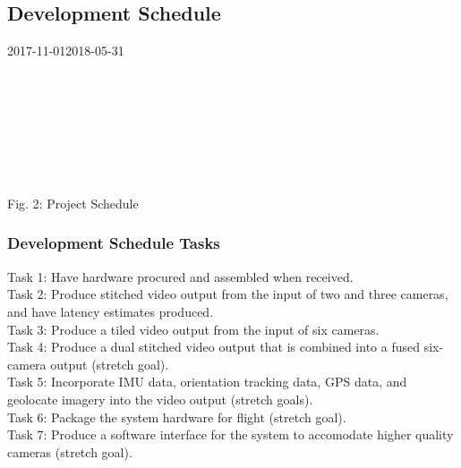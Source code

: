 \documentclass[letterpaper,10pt,serif,draftclsnofoot,onecolumn,compsoc,titlepage]{IEEEtran}
\begin{document}
\subsection{Development Schedule}
	\begin{ganttchart}
    	[hgrid, x unit=0.77mm, y unit chart=9.0mm, title label font=\normalsize, time slot format=isodate]
    	{2017-11-01}{2018-05-31}
    	\\
    	\\
    	\\
    	\\
    	\\
    	\\
    	\\
    	\\
	\end{ganttchart}
\begin{center}
	Fig. 2: Project Schedule
\end{center}	

\subsubsection{Development Schedule Tasks}
Task 1: Have hardware procured and assembled when received.\\
Task 2: Produce stitched video output from the input of two and three cameras, 
and have latency estimates produced.\\
Task 3: Produce a tiled video output from the input of six cameras.\\
Task 4: Produce a dual stitched video output that is combined into a fused 
six-camera output (stretch goal).\\
Task 5: Incorporate IMU data, orientation tracking data, GPS data, and 
geolocate imagery into the video output (stretch goals).\\
Task 6: Package the system hardware for flight (stretch goal).\\
Task 7: Produce a software interface for the system to accomodate higher 
quality cameras (stretch goal).\\
\end{document}
